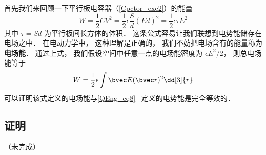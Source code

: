 
首先我们来回顾一下平行板电容器（\autoref{Cpctor_exe2}）的能量
\begin{equation}
W = \frac12 CV^2 = \frac12 \epsilon \frac Sd (Ed)^2 = \frac 12 \epsilon \tau E^2
\end{equation}
其中 $\tau = Sd$ 为平行板间长方体的体积． 这条公式容易让我们联想到电势能储存在电场之中． 在电动力学中， 这种理解是正确的， 我们不妨把电场含有的能量称为\textbf{电场能}． 通过上式， 我们假设空间中任意一点的电场能密度为 $\epsilon E^2/2$， 则总电场能等于
\begin{equation}
W = \frac12 \epsilon \int \bvec E(\bvec r)^2 \dd[3]{r}
\end{equation}
可以证明该式定义的电场能与\autoref{QEng_eq8}~ 定义的电势能是完全等效的．

\subsection{证明}
（未完成）
